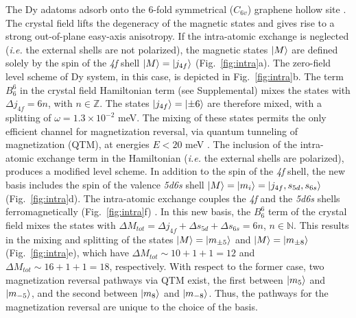\documentclass[
reprint,amsmath,amssymb,aps]{revtex4-2}
\begin{document}
The Dy adatoms adsorb onto the 6-fold symmetrical ($C_{6v}$) graphene hollow site \cite{baltic2018}. The crystal field lifts the degeneracy of the magnetic states and gives rise to a strong out-of-plane easy-axis anisotropy.
If the intra-atomic exchange is neglected (\textit{i.e.} the external shells are not polarized), the magnetic states $\ket{M}$ are defined solely by the spin of the \textit{4f} shell $\ket{M}=\ket{j_{4f}}$ (Fig.~\ref{fig:intra}a). The zero-field level scheme of Dy system, in this case, is depicted in Fig.~\ref{fig:intra}b. The term $B_6^6$ in the crystal field Hamiltonian term (see Supplemental) mixes the states with $\Delta j_{4f}=6n$, with $n\in \mathbb{Z}$. The states $\ket{j_{4f}}=\ket{\pm 6}$ are therefore mixed, with a splitting of $\omega=1.3 \times 10^{-2}$ meV. The mixing of these states permits the only efficient channel for magnetization reversal, via quantum tunneling of magnetization (QTM), at energies $E<20$ meV \citep{baltic2016}. The inclusion of the intra-atomic exchange term in the Hamiltonian (\textit{i.e.} the external shells are polarized), produces a modified level scheme. In addition to the spin of the \textit{4f} shell, the new basis includes the spin of the valence \textit{5d6s} shell $\ket{M}=\ket{m_i}=\ket{j_{4f},s_{5d},s_{6s}}$ (Fig.~\ref{fig:intra}d). The intra-atomic exchange couples the \textit{4f} and the \textit{5d6s} shells ferromagnetically (Fig.~\ref{fig:intra}f) \cite{pivettaMeasuringIntraAtomicExchange2020}. 
In this new basis, the $B_6^6$ term of the crystal field mixes the states with $\Delta M_{tot}=\Delta j_{4f} + \Delta s_{5d} + \Delta s_{6s}=6n$, $n\in \mathbb{N}$. This results in the mixing and splitting of the states $\ket{M}=\ket{m_{\pm 5}}$ and $\ket{M}=\ket{m_{\pm 8}}$ (Fig.~\ref{fig:intra}e), which have $\Delta M_{tot}\sim 10+1+1 = 12$ and $\Delta M_{tot}\sim 16 +1+1=18$, respectively. With respect to the former case, two magnetization reversal pathways via QTM exist, the first between $\ket{m_{5}}$ and $\ket{m_{-5}}$, and the second between $\ket{m_{8}}$ and $\ket{m_{-8}}$. Thus, the pathways for the magnetization reversal are unique to the choice of the basis. 
\end{document}
